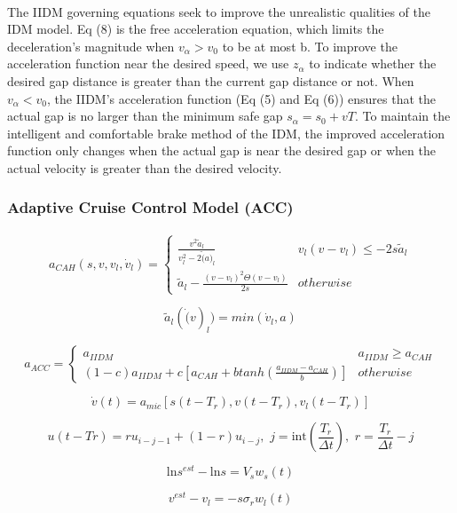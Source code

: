 \documentclass[12pt]{article}
\begin{document}
\paragraph{}
The IIDM governing equations seek to improve the unrealistic qualities of the IDM model. Eq (8) is the free acceleration equation, which limits the deceleration's magnitude when $v_\alpha>v_0$ to be at most b. To improve the acceleration function near the desired speed, we use $z_\alpha$ to indicate whether the desired gap distance is greater than the current gap distance or not.  When $v_\alpha < v_0$, the IIDM's acceleration function (Eq (5) and Eq (6)) ensures that the actual gap is no larger than the minimum safe gap $s_\alpha = s_0+vT$.  To maintain the intelligent and comfortable brake method of the IDM, the improved acceleration function only changes when the actual gap is near the desired gap or when the actual velocity is greater than the desired velocity.
\subsubsection{Adaptive Cruise Control Model (ACC)}



\paragraph{}
$$a_{CAH}(s,v,v_l, \dot{v}_l)= \begin{cases}
\frac{v^2\tilde{a}_l}{v_l^2 - 2 \tilde(a)_l} & v_l(v-v_l) \le -2s\tilde{a}_l\\
\tilde{a}_l - \frac{(v-v_l)^2 \Theta (v-v_l)}{2s} & otherwise
\end{cases}$$

$$\tilde{a}_l(\dot(v)_l) = min(\dot{v}_l, a)$$

$$a_{ACC}= \begin{cases}
a_{IIDM} & a_{IIDM} \ge a_{CAH}\\
(1-c)a_{IIDM} + c\left[a_{CAH} + b tanh(\frac{a_{IIDM}-a_{CAH}}{b}) \right] & otherwise
\end{cases}$$

$$\dot{v}(t) = a_{mic}\left[s(t-T_r), v(t-T_r), v_l(t-T_r) \right]$$

$$u(t-Tr) = ru_{i-j-1} + (1-r)u_{i-j},  \, \, j = \textrm{int}\left(\frac{T_r}{\Delta t} \right), \, \, r = \frac{T_r}{\Delta t} - j$$

$$\textrm{ln} s^{est} - \textrm{ln} s = V_s w_s(t) $$

$$v^{est} - v_l = -s \sigma_r w_l(t)$$
\end{document}
